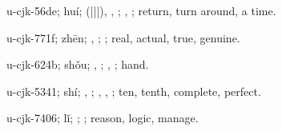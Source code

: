 \begin{multicols}{2}
{\cjkgGlue{}u-cjk-56de; huí; \cjkgGlue{}\cjkgGlue{}(\cjkgGlue{}|\cjkgGlue{}|\cjkgGlue{}|\cjkgGlue{}), \cjkgGlue{}\cjkgGlue{}\cjkgGlue{}, \cjkgGlue{}\cjkgGlue{}\cjkgGlue{}; \cjkgGlue{}, \cjkgGlue{}; return, turn around, a time.

\cjkgGlue{}u-cjk-771f; zhēn; \cjkgGlue{}, \cjkgGlue{}; \cjkgGlue{}; real, actual, true, genuine.

\cjkgGlue{}u-cjk-624b; shǒu; \cjkgGlue{}, \cjkgGlue{}; \cjkgGlue{}, \cjkgGlue{}; hand.

\cjkgGlue{}u-cjk-5341; shí; \cjkgGlue{}, \cjkgGlue{}; \cjkgGlue{}, \cjkgGlue{}, \cjkgGlue{}; ten, tenth, complete, perfect.

\cjkgGlue{}u-cjk-7406; lǐ; \cjkgGlue{}; \cjkgGlue{}; reason, logic, manage.

}
\end{multicols}
